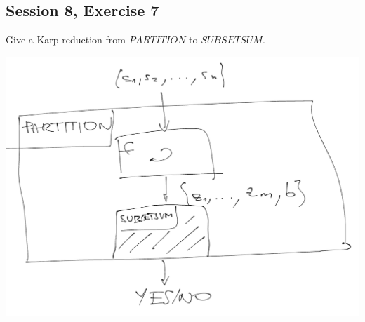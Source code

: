 \subsection {Session 8, Exercise 7}
\label{8f7}


Give a Karp-reduction from $PARTITION$ to $SUBSETSUM$.


\begin{center}
    \includegraphics[width=\linewidth]{./08/07/partition_karp_subsetsum.png}
\end{center}

